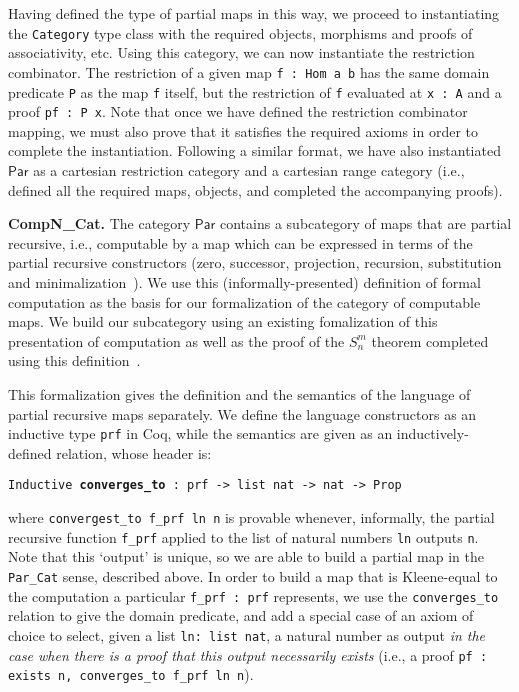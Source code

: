 \documentclass{entcs} \usepackage{entcsmacro}
\begin{document}
Having defined the type of partial maps in this way, we proceed to instantiating the {\tt Category} type class with the required objects, morphisms and proofs of associativity, etc. Using this category, we can now instantiate the restriction combinator. The restriction of a given map {\tt f : Hom a b} has the same domain predicate {\tt P} as the map {\tt f} itself, but the restriction of {\tt f} evaluated at {\tt x : A} and a proof {\tt pf : P x}. Note that once we have defined the restriction combinator mapping, we must also prove that it satisfies the required axioms in order to complete the instantiation. Following a similar format, we have also instantiated $\mathsf{Par}$ as a cartesian restriction category and a cartesian range category (i.e., defined all the required maps, objects, and completed the accompanying proofs).

{\bfseries CompN\_Cat.} The category $\mathsf{Par}$ contains a subcategory of maps that are partial recursive, i.e., computable by a map which can be expressed in terms of the partial recursive constructors (zero, successor, projection, recursion, substitution and minimalization~\cite{Computability}). We use this (informally-presented) definition of formal computation as the basis for our formalization of the category of computable maps. We build our subcategory using an existing fomalization of this presentation of computation as well as the proof of the $S^m_n$ theorem completed using this definition~\cite{SmnForm}.

This formalization gives the definition and the semantics of the
language of partial recursive maps separately. We define the language
constructors as an inductive type {\tt prf} in Coq, while the
semantics are given as an inductively-defined relation, whose header is:

{\tt \small Inductive {\bfseries converges\_to} : prf -> list nat -> nat -> Prop} 

\noindent where {\tt convergest\_to f\_prf ln n} is provable whenever,
informally, the partial recursive function {\tt f\_prf} applied to the
list of natural numbers {\tt ln} outputs {\tt n}. Note that this
`output' is unique, so we are able to build a partial map in the {\tt
  Par\_Cat} sense, described above. In order to build a map that is
Kleene-equal to the computation a particular {\tt f\_prf : prf}
represents, we use the {\tt converges\_to} relation to give the domain
predicate, and add a special case of an axiom of choice to select,
given a list {\tt ln: list nat}, a natural number as output \textit{in
  the case when there is a proof that this output necessarily exists}
(i.e., a proof {\tt pf : exists n, converges\_to f\_prf ln n}).
\end{document}
